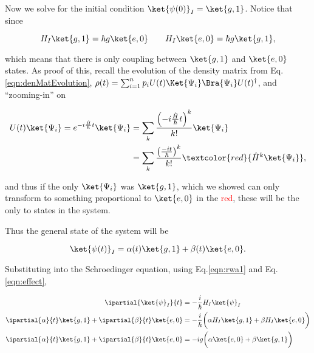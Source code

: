 \noindent    Now     we    solve     for    the     initial    condition
$\ket{\psi(0)}_I = \ket{g,1}$. Notice that since

\begin{equation}
  \label{eqn:effect}
  H_I\ket{g,1} = \hbar g\ket{e,0} \qquad H_I\ket{e,0} = \hbar g\ket{g,1},
\end{equation}

\noindent which  means that there  is only coupling  between $\ket{g,1}$
and $\ket{e,0}$  states. As proof of  this, recall the evolution  of the
density        matrix        from        Eq.\eqref{eqn:denMatEvolution},
$\rho(t)                         =                        \sum_{i=1}^{n}
p_iU(t)\Ket{\Psi_i}\Bra{\Psi_i}U(t)^{\dagger}$, and ``zooming-in'' on

\begin{equation}
  \label{eqn:resonance4}
  \begin{aligned}
    U(t)\ket{\Psi_i} = e^{-i\frac{\hat{H}}{\hbar}t}\ket{\Psi_i} & = \sum_k \frac{\left( -i\frac{\hat{H}}{\hbar}t\right)^k }{k!}\ket{\Psi_i}\\
    &       =        \sum_k       \frac{\left(\frac{-it}{\hbar}\right)^k
    }{k!}\textcolor{red}{\hat{H}^k\ket{\Psi_i}},
  \end{aligned}
\end{equation}

\noindent and thus if the  only $\ket{\Psi_i}$ was $\ket{g,1}$, which we
showed can  only transform to  something proportional to  $\ket{e,0}$ in
the  \textcolor{red}{red}, these  will  be  the only  to  states in  the
system.

Thus the general state of the system will be

\begin{equation}
  \label{eqn:resonance_GeneralEquation}
  \ket{\psi(t)}_I = \alpha(t)\ket{g,1} + \beta(t)\ket{e,0}.
\end{equation}

\noindent   Substituting   into   the   Schroedinger   equation,   using
Eq.\eqref{eqn:rwa1} and Eq.\eqref{eqn:effect},

\begin{equation}
  \begin{aligned}
    \ipartial{\ket{\psi}_I}{t} & = -\frac{i}{\hbar}H_I\ket{\psi}_I\\
    \ipartial{\alpha}{t}\ket{g,1} + \ipartial{\beta}{t}\ket{e,0} & = -\frac{i}{\hbar} \bigg(\alpha H_I\ket{g,1} + \beta H_I\ket{e,0} \bigg)\\
    \ipartial{\alpha}{t}\ket{g,1} + \ipartial{\beta}{t}\ket{e,0} & = -ig\bigg(\alpha\ket{e,0} + \beta\ket{g,1} \bigg)\\
  \end{aligned}
\end{equation}


